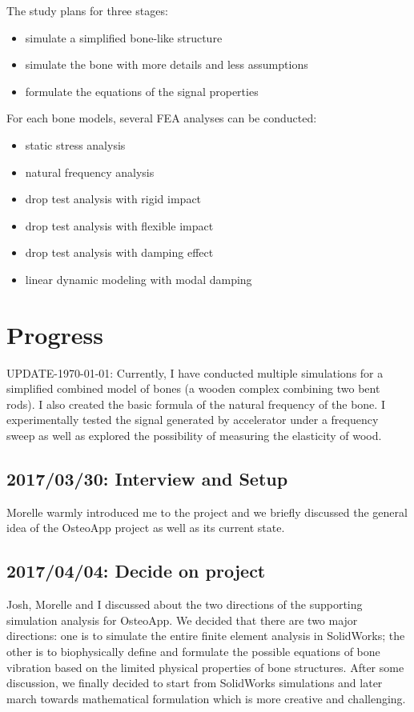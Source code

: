 \documentclass{sigchi}
\begin{document}
The study plans for three stages:
\begin{itemize}
\item simulate a simplified bone-like structure
\item simulate the bone with more details and less assumptions
\item formulate the equations of the signal properties
\newline
\end{itemize}

For each bone models, several FEA analyses can be conducted:
\begin{itemize}
\item static stress analysis
\item natural frequency analysis
\item drop test analysis with rigid impact
\item drop test analysis with flexible impact
\item drop test analysis with damping effect
\item linear dynamic modeling with modal damping 
\end{itemize}

\section{Progress} 

UPDATE-\today: Currently, I have conducted multiple simulations for a simplified combined model of bones (a wooden complex combining two bent rods). I also created the basic formula of the natural frequency of the bone. I experimentally tested the signal generated by accelerator under a frequency sweep as well as explored the possibility of measuring the elasticity of wood.

\subsection{2017/03/30: Interview and Setup}

Morelle warmly introduced me to the project and we briefly discussed the general idea of the OsteoApp project as well as its current state. 

\subsection{2017/04/04: Decide on project}

Josh, Morelle and I discussed about the two directions of the supporting simulation analysis for OsteoApp. We decided that there are two major directions: one is to simulate the entire finite element analysis in SolidWorks; the other is to biophysically define and formulate the possible equations of bone vibration based on the limited physical properties of bone structures. 
After some discussion, we finally decided to start from SolidWorks simulations and later march towards mathematical formulation which is more creative and challenging.
\end{document}
